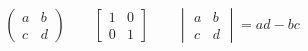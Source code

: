 \[
    \begin{pmatrix} a & b \\ c & d \end{pmatrix}
    \qquad
    \begin{bmatrix} 1 & 0 \\ 0 & 1 \end{bmatrix}
    \qquad
    \begin{vmatrix} a & b \\ c & d \end{vmatrix} = ad - bc
\]
